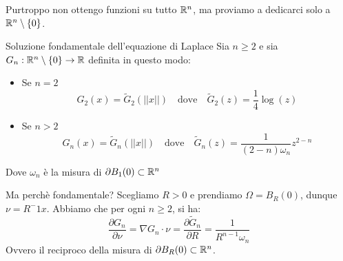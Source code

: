 \documentclass{article}
\begin{document}
Purtroppo non ottengo funzioni su tutto $\mathbb{R}^n$, ma proviamo a dedicarci solo a $\mathbb{R}^n\setminus\{0\}$.

\begin{definition}{Soluzione fondamentale dell'equazione di Laplace}{}
    Sia $n\ge 2$ e sia $G_n : \mathbb{R}^n\setminus\{0\}\to\mathbb{R}$ definita in questo modo:\begin{itemize}
        \item Se $n=2$ \[G_2(x) = \tilde{G}_2(||x||) \quad \text{dove} \quad \tilde{G}_2(z) = \frac{1}{4}\log(z)\]
        \item Se $n>2$ \[G_n(x) = \tilde{G}_n(||x||) \quad \text{dove} \quad \tilde{G}_n(z) =\frac{1}{(2-n)\omega_n} z^{2-n}\]
    \end{itemize}
    Dove $\omega_n$ è la misura di $\partial B_1(0)\subset \mathbb{R}^n$
\end{definition}

\begin{remark}{Ma perchè fondamentale?}{}
    Scegliamo $R>0$ e prendiamo $\Omega = B_R(0)$, dunque $\nu = R^-1 x$. Abbiamo che per ogni $n\ge 2$, si ha:
    \[\frac{\partial G_n}{\partial \nu} = \nabla G_n \cdot \nu = \frac{\partial \tilde{G}_n}{\partial R} =\frac{1}{R^{n-1}\omega_n}\]
    Ovvero il reciproco della misura di $\partial B_R(0)\subset \mathbb{R}^n$.
\end{remark}
\end{document}
